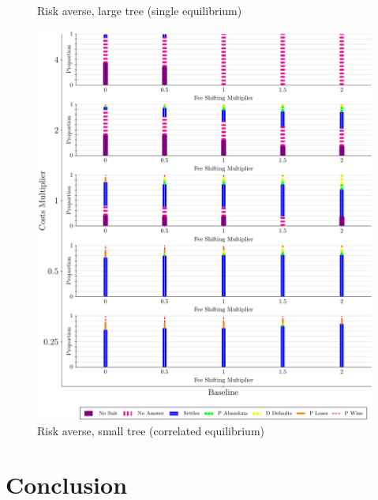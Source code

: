 \documentclass{article}
\begin{document}
\begin{figure}
\begin{minipage}{0.24\textwidth}
		\caption{Risk averse, large tree (single equilibrium)}
		\label{fig:treesize_panel3}
    \end{minipage}\hfill
    \begin{minipage}{0.24\textwidth}
        \centering
		\includegraphics[scale=0.15, trim={0in 0in 0in 0in}, clip]{../Figures/Disposition (Risk Averse) Baseline (Correlated).pdf}
		\caption{Risk averse, small tree (correlated equilibrium)}
		\label{fig:treesize_panel4}
    \end{minipage}
\end{figure}

\section{Conclusion}
\end{document}
